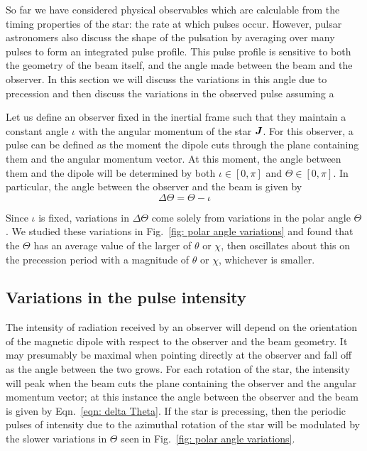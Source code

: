 \documentclass[../full_thesis/full_thesis.tex]{subfiles}
\begin{document}
So far we have considered physical observables which are calculable from the
timing properties of the star: the rate at which pulses occur. However, pulsar
astronomers also discuss the shape of the pulsation by averaging over many
pulses to form an integrated pulse profile. This pulse profile is sensitive to
both the geometry of the beam itself, and the angle made between the beam and
the observer.  In this section we will discuss the variations in this angle due
to precession and then discuss the variations in the observed pulse assuming a

Let us define an observer fixed in the inertial frame such that they
maintain a constant angle $\iota$ with the angular momentum of the star $\boldsymbol{J}$.
For this observer, a pulse can be defined as the moment the dipole cuts through
the plane containing them and the angular momentum vector. At this moment, the
angle between them and the dipole will be determined by both $\iota \in [0, \pi]$ and
$\Theta \in [0, \pi]$. In particular, the angle between the observer and the beam
is given by
\begin{equation}
\Delta\Theta = \Theta - \iota
\label{eqn: delta Theta}
\end{equation}

Since $\iota$ is fixed, variations in $\Delta\Theta$ come solely from variations
in the polar angle $\Theta$. We studied these variations in Fig.~\ref{fig:
polar angle variations} and found that the $\Theta$ has an average value of the
larger of $\theta$ or $\chi$, then oscillates about this on the precession period
with a magnitude of $\theta$ or $\chi$, whichever is smaller.

\subsection{Variations in the pulse intensity}

The intensity of radiation received by an observer will depend on the
orientation of the magnetic dipole with respect to the observer and the beam
geometry. It may presumably be maximal when pointing directly at the observer
and fall off as the angle between the two grows. For each rotation of the star,
the intensity will peak when the beam cuts the plane containing the observer
and the angular momentum vector; at this instance the angle between the
observer and the beam is given by Eqn.~\eqref{eqn: delta Theta}. If the star is
precessing, then the periodic pulses of intensity due to the azimuthal rotation
of the star will be modulated by the slower variations in $\Theta$ seen in
Fig.~\ref{fig: polar angle variations}.
\end{document}
